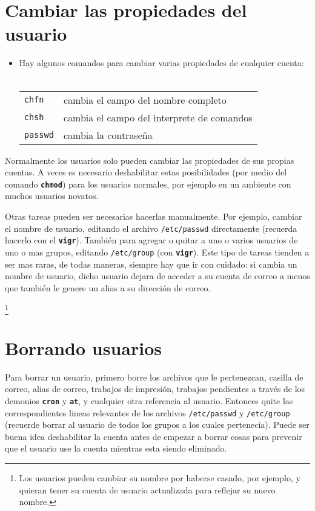  \section{ Cambiar las propiedades del usuario}

\begin{itemize}
	\item Hay algunos comandos para cambiar varias propiedades de cualquier cuenta: \\ \\
\begin{tabular}{ l l }
	\texttt{chfn} & cambia el campo del nombre completo \\
	\texttt{chsh} & cambia el campo del interprete de comandos \\
	\texttt{passwd} & cambia la contraseña \\
\end{tabular}
\end{itemize}


Normalmente los usuarios solo pueden cambiar las propiedades de sus propias
cuentas. A veces es necesario deshabilitar estas posibilidades (por medio del
comando \texttt{\textbf{chmod}})  para los usuarios normales, por ejemplo en un
ambiente con muchos usuarios novatos.

Otras tareas pueden ser necesarias hacerlas manualmente. Por ejemplo,
cambiar el nombre de usuario, editando el archivo
\texttt{/etc/passwd} directamente (recuerda hacerlo con el
\texttt{\textbf{vigr}}). También para agregar o quitar a uno o varios usuarios
de uno o mas grupos, editando \texttt{/etc/group} (con
\texttt{\textbf{vigr}}). Este tipo de tareas tienden a ser mas raras, de todas
maneras, siempre hay que ir con cuidado: si cambia un nombre de usuario, dicho
usuario dejara de acceder a su cuenta de correo a menos que también le genere un
alias a su dirección de correo.
	
		\footnote{Los usuarios pueden cambiar su
		nombre por haberse casado, por ejemplo, y quieran tener su cuenta de usuario
		actualizada para reflejar su nuevo nombre.}
		









\section{Borrando usuarios}

Para borrar un usuario, primero borre los archivos que le pertenezcan,
casilla de correo, alias de correo, trabajos de impresión, trabajos pendientes a
través de los demonios \texttt{\textbf{cron}} y \texttt{\textbf{at}}, y
cualquier otra referencia al usuario.  Entonces quite las correspondientes
lineas relevantes de los archivos \texttt{/etc/passwd} y
\texttt{/etc/group}	 (recuerde borrar al usuario de todos los grupos
a los cuales pertenecía).  Puede ser buena idea deshabilitar la cuenta antes de
empezar a borrar cosas para prevenir que el usuario use la cuenta mientras esta
siendo eliminado.

